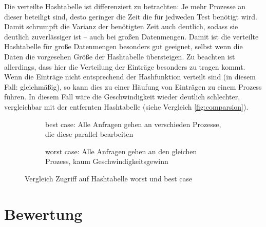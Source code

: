 \documentclass{scrreprt}
\begin{document}
Die verteilte Hashtabelle ist differenziert zu betrachten: Je mehr Prozesse an dieser beteiligt sind, desto geringer die Zeit die für jedweden Test benötigt wird. Damit schrumpft die Varianz der benötigten Zeit auch deutlich, sodass sie deutlich zuverlässiger ist -- auch bei großen Datenmengen. Damit ist die verteilte Hashtabelle für große Datenmengen besonders gut geeignet, selbst wenn die Daten die vorgesehen Größe der Hashtabelle übersteigen. Zu beachten ist allerdings, dass hier die Verteilung der Einträge besonders zu tragen kommt. Wenn die Einträge nicht entsprechend der Hashfunktion verteilt sind (in diesem Fall: gleichmäßig), so kann dies zu einer Häufung von Einträgen zu einem Prozess führen. In diesem Fall wäre die Geschwindigkeit wieder deutlich schlechter, vergleichbar mit der entfernten Hashtabelle (siehe Vergleich \autoref{fig:comparsion}).
\begin{figure}[!ht]
\centering
\begin{subfigure}[b]{0.4\textwidth}
\centering
{}
\caption{best case: Alle Anfragen gehen an verschieden Prozesse, die diese parallel bearbeiten}
\end{subfigure}\hspace{.1\textwidth}
\begin{subfigure}[b]{0.4\textwidth}
\centering
{}
\caption{worst case: Alle Anfragen gehen an den gleichen Prozess, kaum Geschwindigkeitsgewinn}
\end{subfigure}
\caption{Vergleich Zugriff auf Hashtabelle worst und best case}
\label{fig:comparsion}
\end{figure}

\section{Bewertung}
\end{document}
